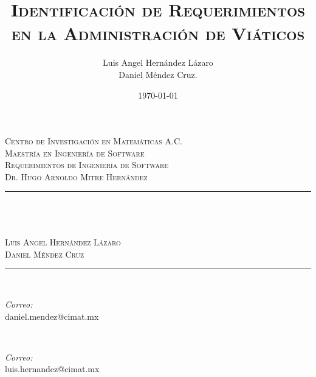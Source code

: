 \documentclass{report}
\title{\textsc{Identificación de Requerimientos en la Administración de Viáticos}}
\author{Luis Angel Hernández Lázaro\\  Daniel Méndez Cruz. }
\date{\today}
\makeatletter
\let\thetitle\@title
\makeatother
\begin{document}

\begin{titlepage}
	\centering
    \vspace*{0.5 cm}
    
    
    \begin{figure}
		\centering
	\end{figure}
    \textsc{\LARGE Centro de Investigación en Matemáticas A.C.}\\[1.0 cm]
	\textsc{\Large Maestría en Ingeniería de Software}\\[0.5 cm]
	\textsc{\large Requerimientos de Ingeniería de Software\\Dr. Hugo Arnoldo Mitre Hernández}\\[0.5 cm]
	\rule{\linewidth}{0.2 mm} \\[0.4 cm]
	{ \huge \bfseries \thetitle}\\ \textsc{\large \\ Luis Angel Hernández Lázaro \\ Daniel Méndez Cruz}
	\rule{\linewidth}{0.2 mm} \\[1.5 cm]
	
	\begin{minipage}{0.5\textwidth}
		\begin{flushleft} \large
			\emph{Correo:}\\
			daniel.mendez@cimat.mx
		\end{flushleft}
	\end{minipage}~
	\begin{minipage}{0.4\textwidth}
		\begin{flushright} \large
			\emph{Correo:} \\
			luis.hernandez@cimat.mx
		\end{flushright}
	\end{minipage}\\[2 cm]
		

\end{titlepage}
\end{document}
